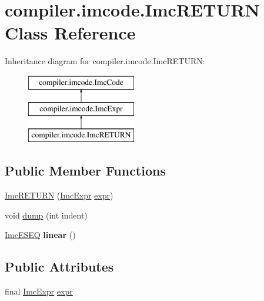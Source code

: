 \hypertarget{classcompiler_1_1imcode_1_1_imc_r_e_t_u_r_n}{}\section{compiler.\+imcode.\+Imc\+R\+E\+T\+U\+RN Class Reference}
\label{classcompiler_1_1imcode_1_1_imc_r_e_t_u_r_n}
Inheritance diagram for compiler.\+imcode.\+Imc\+R\+E\+T\+U\+RN\+:\begin{figure}[H]
\begin{center}
\leavevmode
\includegraphics[height=3.000000cm]{classcompiler_1_1imcode_1_1_imc_r_e_t_u_r_n}
\end{center}
\end{figure}
\subsection*{Public Member Functions}
\begin{DoxyCompactItemize}
\item 
\hyperlink{classcompiler_1_1imcode_1_1_imc_r_e_t_u_r_n_a9978d9582b0483ad2874ad7ed6157014}{Imc\+R\+E\+T\+U\+RN} (\hyperlink{classcompiler_1_1imcode_1_1_imc_expr}{Imc\+Expr} \hyperlink{classcompiler_1_1imcode_1_1_imc_r_e_t_u_r_n_a952c6353103f0816a8c45669492349c7}{expr})
\item 
void \hyperlink{classcompiler_1_1imcode_1_1_imc_r_e_t_u_r_n_a35700088e7645e1162a98266b2de433a}{dump} (int indent)
\item 
\mbox{\label{classcompiler_1_1imcode_1_1_imc_r_e_t_u_r_n_a878d68d42d728a607ccfae2af33d3d9b}} 
\hyperlink{classcompiler_1_1imcode_1_1_imc_e_s_e_q}{Imc\+E\+S\+EQ} {\bfseries linear} ()
\end{DoxyCompactItemize}
\subsection*{Public Attributes}
\begin{DoxyCompactItemize}
\item 
final \hyperlink{classcompiler_1_1imcode_1_1_imc_expr}{Imc\+Expr} \hyperlink{classcompiler_1_1imcode_1_1_imc_r_e_t_u_r_n_a952c6353103f0816a8c45669492349c7}{expr}
\end{DoxyCompactItemize}



